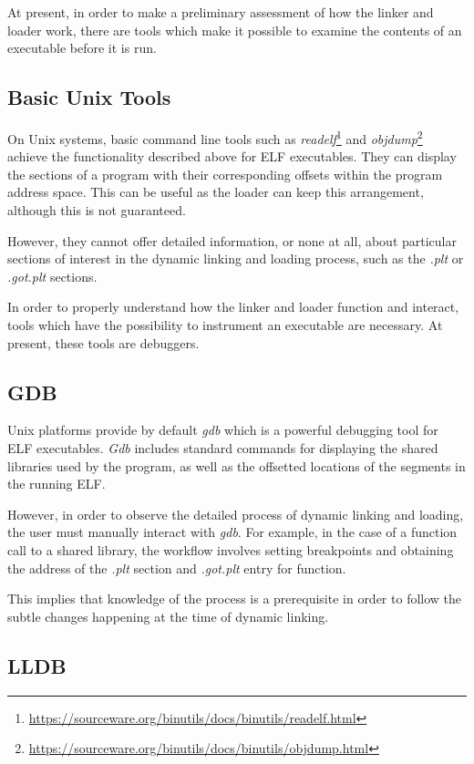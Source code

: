 At present, in order to make a preliminary assessment of how the linker and loader work, there are tools which make it possible to examine the contents of an executable before it is run. 

\subsection{Basic Unix Tools}

On Unix systems, basic command line tools such as \textit{readelf}\footnote{\url{https://sourceware.org/binutils/docs/binutils/readelf.html}} and \textit{objdump}\footnote{\url{https://sourceware.org/binutils/docs/binutils/objdump.html}} achieve the functionality described above for ELF executables. They can display the sections of a program with their corresponding offsets within the program address space. This can be useful as the loader can keep this arrangement, although this is not guaranteed.

However, they cannot offer detailed information, or none at all, about particular sections of interest in the dynamic linking and loading process, such as the \textit{.plt} or \textit{.got.plt} sections.

In order to properly understand how the linker and loader function and interact, tools which have the possibility to instrument an executable are necessary. At present, these tools are debuggers.

\subsection{GDB}

Unix platforms provide by default \textit{gdb} which is a powerful debugging tool for ELF executables. \textit{Gdb} includes standard commands for displaying the shared libraries used by the program, as well as the offsetted locations of the segments in the running ELF.

However, in order to observe the detailed process of dynamic linking and loading, the user must manually interact with \textit{gdb}. For example, in the case of a function call to a shared library,  the workflow involves setting breakpoints and obtaining the address of the \textit{.plt} section and \textit{.got.plt} entry for function.

This implies that knowledge of the process is a prerequisite in order to follow the subtle changes happening at the time of dynamic linking.

\subsection{LLDB}


